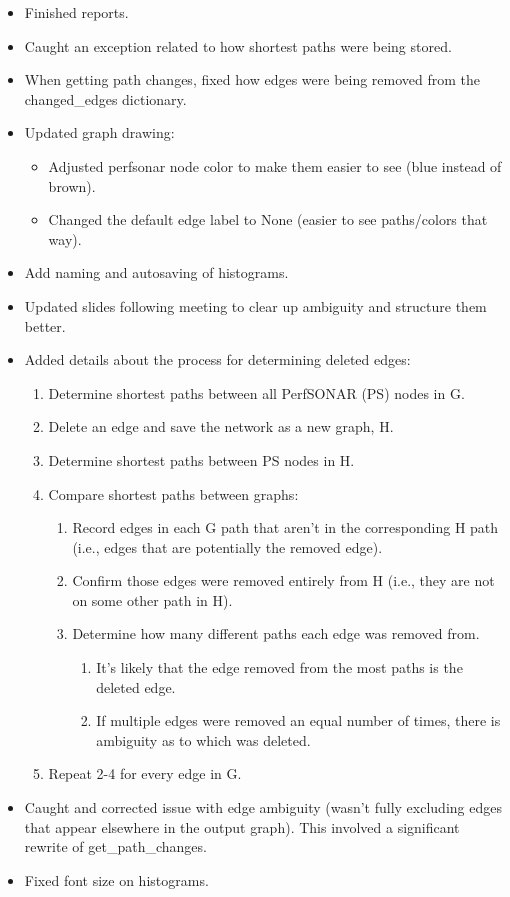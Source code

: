 \documentclass{weeklyreport}
\begin{document}
\begin{itemize}
	\item Finished reports.
	\item Caught an exception related to how shortest paths were being stored.
	\item When getting path changes, fixed how edges were being removed from the changed\_edges dictionary.
	\item Updated graph drawing:
	\begin{itemize}
		\item Adjusted perfsonar node color to make them easier to see (blue instead of brown).
		\item Changed the default edge label to None (easier to see paths/colors that way).
	\end{itemize}
	\item Add naming and autosaving of histograms.
	\item Updated slides following meeting to clear up ambiguity and structure them better.
	\item Added details about the process for determining deleted edges:
	\begin{enumerate}
		\item Determine shortest paths between all PerfSONAR (PS) nodes in G.
		\item Delete an edge and save the network as a new graph, H.
		\item Determine shortest paths between PS nodes in H.
		\item Compare shortest paths between graphs:
		\begin{enumerate}
			\item Record edges in each G path that aren’t in the corresponding H path (i.e., edges that are potentially the removed edge).
			\item Confirm those edges were removed entirely from H (i.e., they are not on some other path in H).
			\item Determine how many different paths each edge was removed from.
			\begin{enumerate}
				\item It’s likely that the edge removed from the most paths is the deleted edge.
				\item If multiple edges were removed an equal number of times, there is ambiguity as to which was deleted.
			\end{enumerate}
		\end{enumerate}
		\item Repeat 2-4 for every edge in G.
	\end{enumerate}
	\item Caught and corrected issue with edge ambiguity (wasn't fully excluding edges that appear elsewhere in the output graph). This involved a significant rewrite of get\_path\_changes.
	\item Fixed font size on histograms.
\end{itemize}
\end{document}
